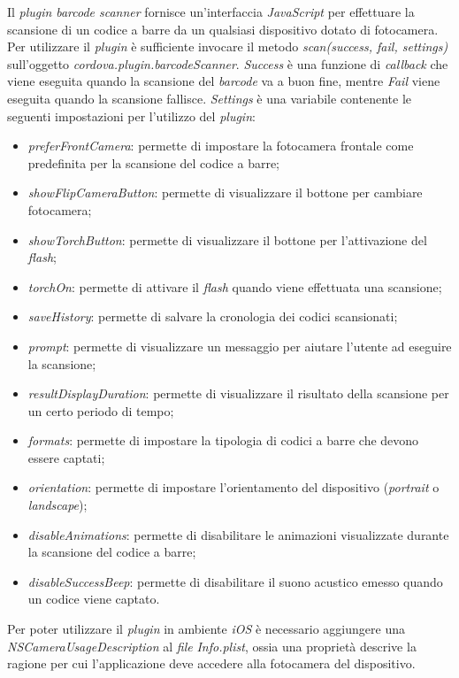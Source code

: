 Il \textit{plugin} \textit{barcode scanner} fornisce un'interfaccia \textit{JavaScript} per effettuare la scansione di un codice a barre da un qualsiasi dispositivo dotato di fotocamera. Per utilizzare il \textit{plugin} è sufficiente invocare il metodo \textit{scan(success, fail, settings)} sull'oggetto \textit{cordova.plugin.barcodeScanner}. \textit{Success} è una funzione di \textit{callback} che viene eseguita quando la scansione del \textit{barcode} va a buon fine, mentre \textit{Fail} viene eseguita quando la scansione fallisce. \textit{Settings} è una variabile contenente le seguenti impostazioni per l'utilizzo del \textit{plugin}:
\begin{itemize}
	\item \textit{preferFrontCamera}: permette di impostare la fotocamera frontale come predefinita per la scansione del codice a barre;
	\item \textit{showFlipCameraButton}: permette di visualizzare il bottone per cambiare fotocamera;
	\item \textit{showTorchButton}: permette di visualizzare il bottone per l'attivazione del \textit{flash};
	\item \textit{torchOn}: permette di attivare il \textit{flash} quando viene effettuata una scansione;
	\item \textit{saveHistory}: permette di salvare la cronologia dei codici scansionati;
	\item \textit{prompt}: permette di visualizzare un messaggio per aiutare l'utente ad eseguire la scansione;
	\item \textit{resultDisplayDuration}: permette di visualizzare il risultato della scansione per un certo periodo di tempo;
	\item \textit{formats}: permette di impostare la tipologia di codici a barre che devono essere captati;
	\item \textit{orientation}: permette di impostare l'orientamento del dispositivo (\textit{portrait} o \textit{landscape});
	\item \textit{disableAnimations}: permette di disabilitare le animazioni visualizzate durante la scansione del codice a barre;
	\item \textit{disableSuccessBeep}: permette di disabilitare il suono acustico emesso quando un codice viene captato.
\end{itemize}
Per poter utilizzare il \textit{plugin} in ambiente \textit{iOS} è necessario aggiungere una \textit{NSCameraUsageDescription} al \textit{file} \textit{Info.plist}, ossia una proprietà descrive la ragione per cui l'applicazione deve accedere alla fotocamera del dispositivo.

